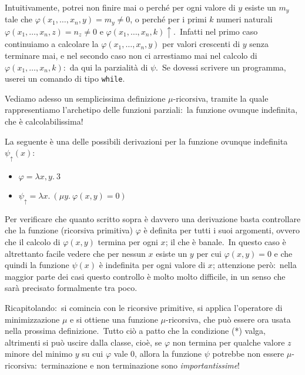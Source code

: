 \noindent Intuitivamente, potrei non finire mai o perché per ogni valore di $y$ esiste
un $m_y$ tale che $\varphi(x_1,\dots, x_n, y) = m_y \neq 0$, o perché per i primi $k$ numeri naturali $\varphi(x_1,\dots, x_n, z) = n_z \neq 0$ e $\varphi(x_1, \dots, x_n, k) \uparrow$.\
Infatti nel primo caso continuiamo a calcolare la $\varphi(x_1,\dots, x_n, y)$ per valori crescenti di $y$ senza terminare mai, e nel secondo caso non ci arrestiamo mai nel calcolo di $\varphi(x_1,\dots, x_n, k)$:\ da qui la parzialità di $\psi$.\
Se dovessi scrivere un programma, userei un comando di tipo \texttt{while}.

Vediamo adesso un semplicissima definizione $\mu$-ricorsiva, tramite la quale rappresentiamo l'archetipo delle funzioni parziali:\ la funzione ovunque indefinita, che è calcolabilissima!

\begin{example}
    La seguente è una delle possibili derivazioni per la funzione ovunque indefinita $\psi_{\uparrow}(x)$:
    \begin{itemize}
        \item[] $\varphi = \lambda x,y.\ 3$
        \item[] $\psi_\uparrow = \lambda x.\ (\mu y.\ \varphi(x,y)= 0)$
    \end{itemize}
    Per verificare che quanto scritto sopra è davvero una derivazione basta controllare che la funzione (ricorsiva primitiva) $\varphi$ è definita per tutti i suoi argomenti, ovvero che il calcolo di $\varphi(x, y)$ termina per ogni $x$; il che è banale.\
    In questo caso è altrettanto facile vedere che per nessun $x$ esiste un $y$ per cui $\varphi(x, y) = 0$ e che quindi la funzione $\psi(x)$ è indefinita per ogni valore di $x$; attenzione però:\ nella maggior parte dei casi questo controllo è molto molto difficile, in un senso che sarà precisato formalmente tra poco.
\end{example}

\noindent Ricapitolando:\ si comincia con le ricorsive primitive, si applica l'operatore di minimizzazione $\mu$ e si ottiene una funzione $\mu$-ricorsiva, che può essere ora usata nella prossima definizione.\
Tutto ciò a patto che la condizione (*) valga, altrimenti si può uscire dalla classe, cioè, se $\varphi$ non termina per qualche valore $z$ minore del minimo $y$ su cui $\varphi$ vale 0, allora la funzione $\psi$ potrebbe non essere $\mu$-ricorsiva:\ terminazione e non terminazione sono \textit{importantissime}!

